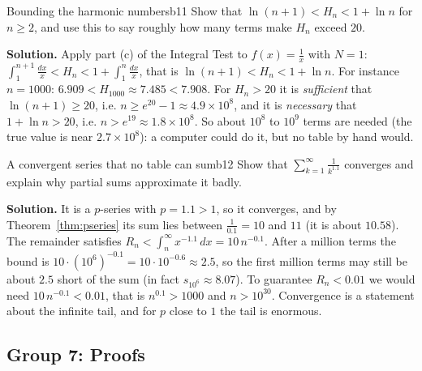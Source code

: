 \documentclass[11pt]{article}
\begin{document}
\begin{exmp}{Bounding the harmonic numbers}{b11}
Show that $\ln(n+1)<H_n<1+\ln n$ for $n\ge2$, and use this to say roughly how many terms make $H_n$ exceed $20$.

\textbf{Solution.} Apply part (c) of the Integral Test to $f(x)=\frac1x$ with $N=1$: $\int_1^{n+1}\frac{dx}x<H_n<1+\int_1^n\frac{dx}x$, that is $\ln(n+1)<H_n<1+\ln n$. For instance $n=1000$: $6.909<H_{1000}\approx7.485<7.908$. For $H_n>20$ it is \emph{sufficient} that $\ln(n+1)\ge20$, i.e. $n\ge e^{20}-1\approx4.9\times10^8$, and it is \emph{necessary} that $1+\ln n>20$, i.e. $n>e^{19}\approx1.8\times10^8$. So about $10^8$ to $10^9$ terms are needed (the true value is near $2.7\times10^8$): a computer could do it, but no table by hand would.
\end{exmp}

\begin{exmp}{A convergent series that no table can sum}{b12}
Show that $\displaystyle\sum_{k=1}^\infty\frac1{k^{1.1}}$ converges and explain why partial sums approximate it badly.

\textbf{Solution.} It is a $p$-series with $p=1.1>1$, so it converges, and by Theorem~\ref{thm:pseries} its sum lies between $\frac1{0.1}=10$ and $11$ (it is about $10.58$). The remainder satisfies $R_n<\int_n^\infty x^{-1.1}\,dx=10\,n^{-0.1}$. After a million terms the bound is $10\cdot(10^6)^{-0.1}=10\cdot10^{-0.6}\approx2.5$, so the first million terms may still be about $2.5$ short of the sum (in fact $s_{10^6}\approx8.07$). To guarantee $R_n<0.01$ we would need $10\,n^{-0.1}<0.01$, that is $n^{0.1}>1000$ and $n>10^{30}$. Convergence is a statement about the infinite tail, and for $p$ close to $1$ the tail is enormous.
\end{exmp}

\subsection*{Group 7: Proofs}
\end{document}

